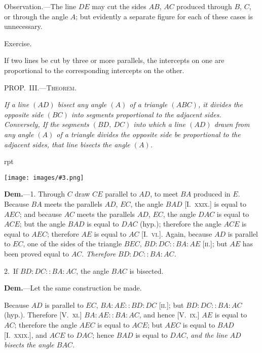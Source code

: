 \documentclass[oneside]{book}
\newcounter{wrapwidth}
\newcommand\mypropl[2]{
\bigskip\Needspace*{4\baselineskip}\begin{center}\textsc{#1}\end{center}
\hspace{\parindent}\emph{#2}\par\medskip
}
\newcommand\exhead[1]{
\Needspace*{5\baselineskip}\begin{center}
\textsf{#1}
\end{center}
}
\newcommand\imgflow[3]{
\setcounter{wrapwidth}{#1}
\begin{wrapfigure}[#2]{r}{\value{wrapwidth}pt}
\begin{center}
\vspace{-0.3in}
\texttt{[image: images/\#3.png]}
\end{center}
\end{wrapfigure}
}
\begin{document}
\smallskip
\begin{footnotesize}
\textsf{Observation.}---The line $DE$ may cut the sides $AB$, $AC$ produced
through $B$, $C$, or through the angle $A$; but evidently a
separate figure for each of these cases is unnecessary.
\par\end{footnotesize}

\exhead{Exercise.}

\begin{footnotesize}
If two lines be cut by three or more parallels, the intercepts
on one are proportional to the corresponding intercepts on the
other.
\par\end{footnotesize}

\mypropl{PROP\@.~III\@.---Theorem.}{If a line $(AD)$ bisect any angle $(A)$ of a triangle $(ABC)$,
it divides the opposite side $(BC)$ into segments proportional
to the adjacent sides. \textrm{Conversely,} If the segments
$(BD,\ DC)$ into which a line $(AD)$ drawn from any angle
$(A)$ of a triangle divides the opposite side be proportional
to the adjacent sides, that line bisects the angle $(A)$.}

\imgflow{108}{8}{f171}

\textbf{Dem.}---1. Through $C$ draw $CE$ parallel to $AD$, to
meet $BA$ produced in $E$. Because $BA$ meets the
parallels $AD$, $EC$, the angle $BAD$ [I.~\textsc{xxix}.] is equal
to $AEC$; and because $AC$ meets the parallels $AD$, $EC$,
the angle $DAC$ is equal to $ACE$;
but the angle $BAD$ is equal to
$DAC$ (hyp.); therefore the angle
$ACE$ is equal to $AEC$; therefore
$AE$ is equal to $AC$ [I.~\textsc{vi}.]. Again,
because $AD$ is parallel to $EC$, one
of the sides of the triangle $BEC$,
$BD : DC :: BA : AE$ [\textsc{ii.}];\label{VIii} but
$AE$ has been proved equal to $AC$.  \emph{Therefore
$BD : DC :: BA : AC$.}

2.~If $BD : DC :: BA : AC$, the angle $BAC$ is bisected.

\textbf{Dem.}---Let the same construction be made.

Because $AD$ is parallel to $EC$, $BA: AE :: BD : DC$
\textsc{[ii.]}; but $BD : DC:: BA : AC$ (hyp.). Therefore
[V.~\textsc{xi}.] $BA : AE :: BA : AC$, and hence [V.~\textsc{ix}.] $AE$
is equal to $AC$; therefore the angle $AEC$ is equal to
$ACE$; but $AEC$ is equal to $BAD$ [I.~\textsc{xxix}.], and $ACE$
to $DAC$; hence $BAD$ is equal to $DAC$, \textit{and the line $AD$
bisects the angle $BAC$.}
\end{document}
